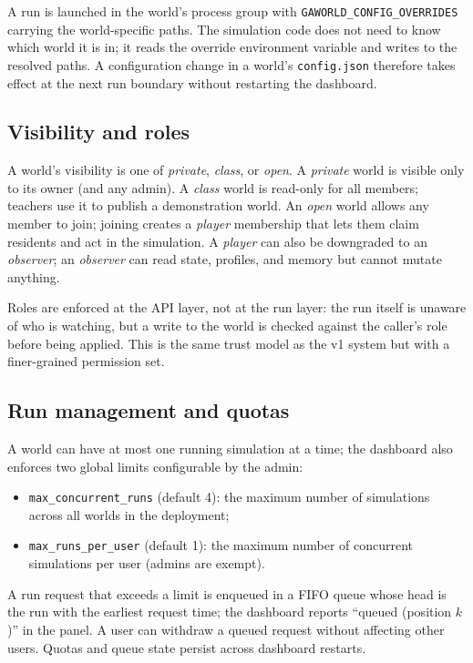 A run is launched in the world's process group with
\texttt{GAWORLD\_CONFIG\_OVERRIDES} carrying the world-specific paths.  The
simulation code does not need to know which world it is in; it reads the
override environment variable and writes to the resolved paths.
A configuration change in a world's \texttt{config.json} therefore takes
effect at the next run boundary without restarting the dashboard.

\subsection{Visibility and roles}

A world's visibility is one of \emph{private}, \emph{class}, or
\emph{open}.  A \emph{private} world is visible only to its owner (and any
admin).  A \emph{class} world is read-only for all members; teachers use it
to publish a demonstration world.  An \emph{open} world allows any member
to join; joining creates a \emph{player} membership that lets them claim
residents and act in the simulation.  A \emph{player} can also be downgraded
to an \emph{observer}; an \emph{observer} can read state, profiles, and
memory but cannot mutate anything.

Roles are enforced at the API layer, not at the run layer: the run itself
is unaware of who is watching, but a write to the world is checked against
the caller's role before being applied.  This is the same trust model as
the v1 system but with a finer-grained permission set.

\subsection{Run management and quotas}

A world can have at most one running simulation at a time; the dashboard
also enforces two global limits configurable by the admin:

\begin{itemize}[leftmargin=*]
  \item \texttt{max\_concurrent\_runs} (default 4): the maximum number of
  simulations across all worlds in the deployment;
  \item \texttt{max\_runs\_per\_user} (default 1): the maximum number of
  concurrent simulations per user (admins are exempt).
\end{itemize}

A run request that exceeds a limit is enqueued in a FIFO queue whose head
is the run with the earliest request time; the dashboard reports
``queued (position $k$)'' in the panel.  A user can withdraw a queued
request without affecting other users.  Quotas and queue state persist
across dashboard restarts.

